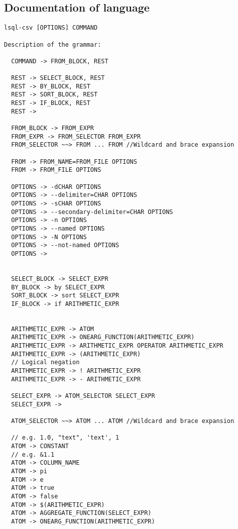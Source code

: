 \subsection{Documentation of language}
\begin{verbatim}
lsql-csv [OPTIONS] COMMAND
      
Description of the grammar:
  
  COMMAND -> FROM_BLOCK, REST
                            
  REST -> SELECT_BLOCK, REST 
  REST -> BY_BLOCK, REST   
  REST -> SORT_BLOCK, REST 
  REST -> IF_BLOCK, REST   
  REST ->
  
  FROM_BLOCK -> FROM_EXPR
  FROM_EXPR -> FROM_SELECTOR FROM_EXPR
  FROM_SELECTOR ~~> FROM ... FROM //Wildcard and brace expansion
  
  FROM -> FROM_NAME=FROM_FILE OPTIONS
  FROM -> FROM_FILE OPTIONS
  
  OPTIONS -> -dCHAR OPTIONS
  OPTIONS -> --delimiter=CHAR OPTIONS
  OPTIONS -> -sCHAR OPTIONS
  OPTIONS -> --secondary-delimiter=CHAR OPTIONS
  OPTIONS -> -n OPTIONS  
  OPTIONS -> --named OPTIONS
  OPTIONS -> -N OPTIONS   
  OPTIONS -> --not-named OPTIONS
  OPTIONS ->
  
  
  SELECT_BLOCK -> SELECT_EXPR
  BY_BLOCK -> by SELECT_EXPR
  SORT_BLOCK -> sort SELECT_EXPR                                                                                                                              
  IF_BLOCK -> if ARITHMETIC_EXPR
  
                                                                                                                 
  ARITHMETIC_EXPR -> ATOM  
  ARITHMETIC_EXPR -> ONEARG_FUNCTION(ARITHMETIC_EXPR)                                                                                                                                            
  ARITHMETIC_EXPR -> ARITHMETIC_EXPR OPERATOR ARITHMETIC_EXPR
  ARITHMETIC_EXPR -> (ARITHMETIC_EXPR)
  // Logical negation
  ARITHMETIC_EXPR -> ! ARITHMETIC_EXPR
  ARITHMETIC_EXPR -> - ARITHMETIC_EXPR
  
  SELECT_EXPR -> ATOM_SELECTOR SELECT_EXPR                                                                                                                                     
  SELECT_EXPR ->
  
  ATOM_SELECTOR ~~> ATOM ... ATOM //Wildcard and brace expansion
  
  // e.g. 1.0, "text", 'text', 1
  ATOM -> CONSTANT
  // e.g. &1.1
  ATOM -> COLUMN_NAME
  ATOM -> pi   
  ATOM -> e
  ATOM -> true
  ATOM -> false
  ATOM -> $(ARITHMETIC_EXPR)
  ATOM -> AGGREGATE_FUNCTION(SELECT_EXPR)
  ATOM -> ONEARG_FUNCTION(ARITHMETIC_EXPR)


\end{verbatim}
